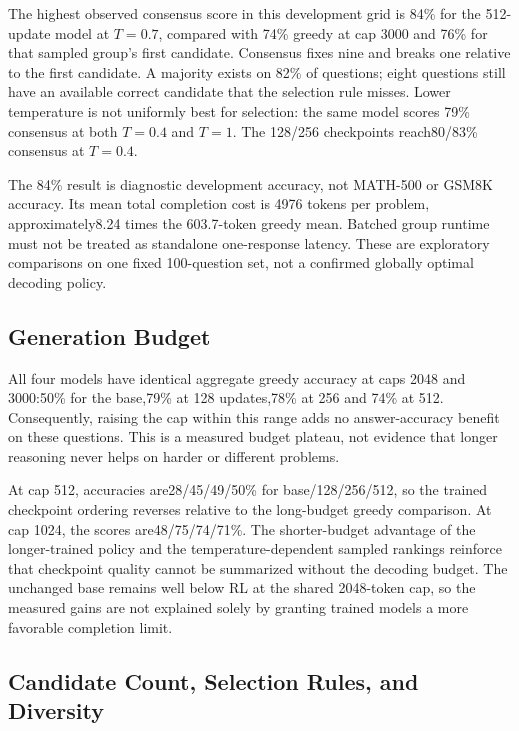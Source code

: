 \documentclass[conference]{IEEEtran}
\begin{document}
The highest observed consensus score in this development grid is 84\% for the 512-update model at $T=0.7$, compared with 74\% greedy at cap 3000 and 76\% for that sampled group's first candidate. Consensus fixes nine and breaks one relative to the first candidate. A majority exists on 82\% of questions; eight questions still have an available correct candidate that the selection rule misses. Lower temperature is not uniformly best for selection: the same model scores 79\% consensus at both $T=0.4$ and $T=1$. The 128/256 checkpoints reach80/83\% consensus at $T=0.4$.

The 84\% result is diagnostic development accuracy, not MATH-500 or GSM8K accuracy. Its mean total completion cost is 4976 tokens per problem, approximately8.24 times the 603.7-token greedy mean. Batched group runtime must not be treated as standalone one-response latency. These are exploratory comparisons on one fixed 100-question set, not a confirmed globally optimal decoding policy.

\subsection{Generation Budget}
All four models have identical aggregate greedy accuracy at caps 2048 and 3000:50\% for the base,79\% at 128 updates,78\% at 256 and 74\% at 512. Consequently, raising the cap within this range adds no answer-accuracy benefit on these questions. This is a measured budget plateau, not evidence that longer reasoning never helps on harder or different problems.

At cap 512, accuracies are28/45/49/50\% for base/128/256/512, so the trained checkpoint ordering reverses relative to the long-budget greedy comparison. At cap 1024, the scores are48/75/74/71\%. The shorter-budget advantage of the longer-trained policy and the temperature-dependent sampled rankings reinforce that checkpoint quality cannot be summarized without the decoding budget. The unchanged base remains well below RL at the shared 2048-token cap, so the measured gains are not explained solely by granting trained models a more favorable completion limit.

\subsection{Candidate Count, Selection Rules, and Diversity}



\end{document}
